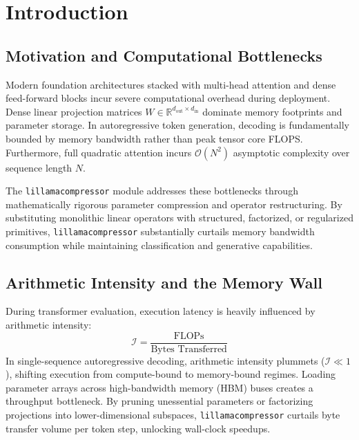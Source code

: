 \section{Introduction}

\subsection{Motivation and Computational Bottlenecks}
Modern foundation architectures stacked with multi-head attention and dense feed-forward blocks incur severe computational overhead during deployment. Dense linear projection matrices $W \in \mathbb{R}^{d_{\text{out}} \times d_{\text{in}}}$ dominate memory footprints and parameter storage. In autoregressive token generation, decoding is fundamentally bounded by memory bandwidth rather than peak tensor core FLOPS. Furthermore, full quadratic attention incurs $\mathcal{O}(N^2)$ asymptotic complexity over sequence length $N$.

The \texttt{lillamacompressor} module addresses these bottlenecks through mathematically rigorous parameter compression and operator restructuring. By substituting monolithic linear operators with structured, factorized, or regularized primitives, \texttt{lillamacompressor} substantially curtails memory bandwidth consumption while maintaining classification and generative capabilities.

\subsection{Arithmetic Intensity and the Memory Wall}
During transformer evaluation, execution latency is heavily influenced by arithmetic intensity:
\[
\mathcal{I} = \frac{\text{FLOPs}}{\text{Bytes Transferred}}
\]
In single-sequence autoregressive decoding, arithmetic intensity plummets ($\mathcal{I} \ll 1$), shifting execution from compute-bound to memory-bound regimes. Loading parameter arrays across high-bandwidth memory (HBM) buses creates a throughput bottleneck. By pruning unessential parameters or factorizing projections into lower-dimensional subspaces, \texttt{lillamacompressor} curtails byte transfer volume per token step, unlocking wall-clock speedups.

